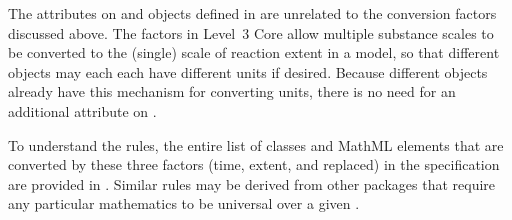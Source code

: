 The  attributes on \Species and \Model objects
defined in \sbmlthreecore are unrelated to the conversion factors
discussed above.  The factors in Level~3 Core allow multiple substance
scales to be converted to the (single) scale of reaction extent in a
model, so that different \Species objects may each each have different
units if desired.  Because different \Species objects already have this
mechanism for converting units, there is no need for an additional
 attribute on \Submodel.

To understand the rules, the entire list of classes and MathML elements
that are converted by these three factors (time, extent, and
replaced) in the \sbmlthreecore specification are provided
in .  Similar rules may be derived from other
packages that require any particular mathematics to be universal over 
a given \Model.

\newcommand{\sprd}[2]{\raisebox{-#1pt}[0pt][(#1pt * 2) + 4pt]{#2}}
\newcommand{\persymb}{\emph{Conversion factor for referenced object}}


